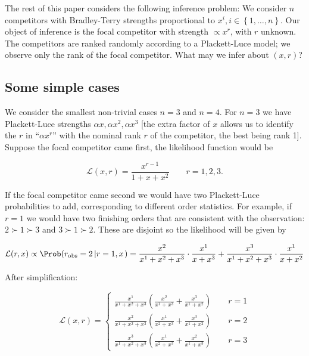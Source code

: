 \documentclass[article]{ajs}  %
\begin{document}
The rest of this paper considers the following inference problem: We
consider $n$ competitors with Bradley-Terry strengths proportional to
$x^i, i\in\left\lbrace 1,\ldots,n\right\rbrace$.  Our object of
inference is the focal competitor with strength $\propto x^r$, with
$r$ unknown.  The competitors are ranked randomly according to a
Plackett-Luce model; we observe only the rank of the focal competitor.
What may we infer about $(x,r)$?

\subsection{Some simple cases}

We consider the smallest non-trivial cases $n=3$ and $n=4$.  For $n=3$
we have Plackett-Luce strengths $\alpha x,\alpha x^2,\alpha x^3$ [the
  extra factor of $x$ allows us to identify the $r$ in ``$\alpha
  x^r$'' with the nominal rank $r$ of the competitor, the best being
  rank 1].  Suppose the focal competitor came first, the likelihood
function would be

\begin{equation}
  \mathcal{L}(x,r)=\frac{x^{r-1}}{1+x+x^2}\qquad r=1,2,3.
\end{equation}

If the focal competitor came second we would have two Plackett-Luce
probabilities to add, corresponding to different order statistics.
For example, if $r=1$ we would have two finishing orders that are
consistent with the observation: $2\succ 1\succ 3$ and $3\succ 1\succ
2$.  These are disjoint so the likelihood will be given by

$$
\mathcal{L}(r,x)\propto
\Prob(r_\text{obs}=2\left|r=1,x\right.)=
\frac{x^2}{x^1+x^2+x^3}\cdot\frac{x^1}{x+x^3} + 
\frac{x^3}{x^1+x^2+x^3}\cdot\frac{x^1}{x+x^2}
$$

After simplification:

\begin{equation}\label{aftersim}
  \mathcal{L}(x,r)=
  \begin{cases}
    \frac{x^1}{x^1+x^2+x^3}\left(\frac{x^2}{x^1+x^3} + \frac{x^3}{x^1+x^2}\right)\qquad r=1\\
    \frac{x^2}{x^1+x^2+x^3}\left(\frac{x^1}{x^2+x^3} + \frac{x^3}{x^1+x^2}\right)\qquad r=2\\
    \frac{x^3}{x^1+x^2+x^3}\left(\frac{x^1}{x^2+x^3} + \frac{x^2}{x^1+x^3}\right)\qquad r=3
\end{cases}
\end{equation}
\end{document}
